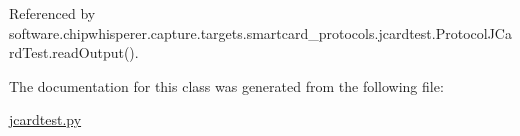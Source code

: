 Referenced by software.\+chipwhisperer.\+capture.\+targets.\+smartcard\+\_\+protocols.\+jcardtest.\+Protocol\+J\+Card\+Test.\+read\+Output().



The documentation for this class was generated from the following file\+:\begin{DoxyCompactItemize}
\item 
\hyperlink{jcardtest_8py}{jcardtest.\+py}\end{DoxyCompactItemize}
